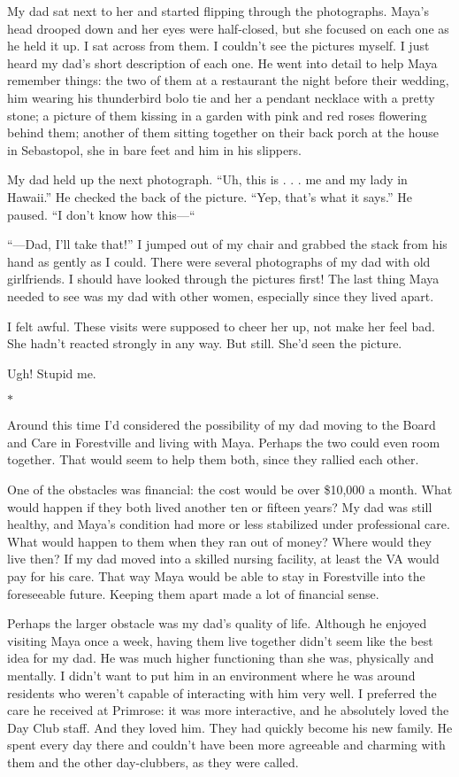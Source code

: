 \documentclass[12pt]{book}
\begin{document}
My dad sat next to her and started flipping through the photographs. Maya's head drooped down and her eyes were half-closed, but she focused on each one as he held it up. I sat across from them. I couldn't see the pictures myself. I just heard my dad's short description of each one. He went into detail to help Maya remember things: the two of them at a restaurant the night before their wedding, him wearing his thunderbird bolo tie and her a pendant necklace with a pretty stone; a picture of them kissing in a garden with pink and red roses flowering behind them; another of them sitting together on their back porch at the house in Sebastopol, she in bare feet and him in his slippers.

My dad held up the next photograph. ``Uh, this is . . . me and my lady in Hawaii.'' He checked the back of the picture. ``Yep, that's what it says.'' He paused. ``I don't know how this---``

``---Dad, I'll take that!'' I jumped out of my chair and grabbed the stack from his hand as gently as I could. There were several photographs of my dad with old girlfriends. I should have looked through the pictures first! The last thing Maya needed to see was my dad with other women, especially since they lived apart.

I felt awful. These visits were supposed to cheer her up, not make her feel bad. She hadn't reacted strongly in any way. But still. She'd seen the picture.

Ugh! Stupid me.

\begin{center}$*$\end{center}

Around this time I'd considered the possibility of my dad moving to the Board and Care in Forestville and living with Maya. Perhaps the two could even room together. That would seem to help them both, since they rallied each other.

One of the obstacles was financial: the cost would be over \$10,000 a month. What would happen if they both lived another ten or fifteen years? My dad was still healthy, and Maya's condition had more or less stabilized under professional care. What would happen to them when they ran out of money? Where would they live then? If my dad moved into a skilled nursing facility, at least the VA would pay for his care. That way Maya would be able to stay in Forestville into the foreseeable future. Keeping them apart made a lot of financial sense.

Perhaps the larger obstacle was my dad's quality of life. Although he enjoyed visiting Maya once a week, having them live together didn't seem like the best idea for my dad. He was much higher functioning than she was, physically and mentally. I didn't want to put him in an environment where he was around residents who weren't capable of interacting with him very well. I preferred the care he received at Primrose: it was more interactive, and he absolutely loved the Day Club staff. And they loved him. They had quickly become his new family. He spent every day there and couldn't have been more agreeable and charming with them and the other day-clubbers, as they were called.
\end{document}
